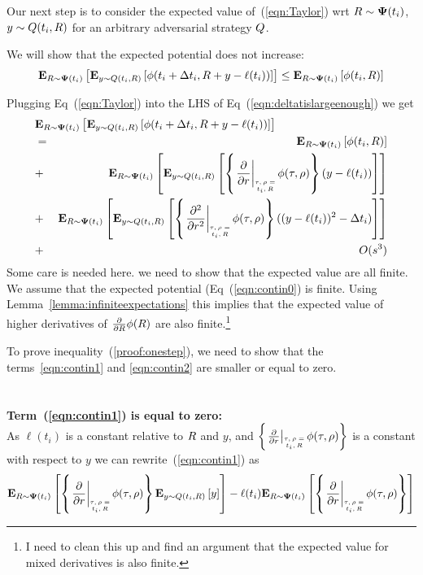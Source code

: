 \documentclass{article}[12pt]
\begin{document}
{Our next step is to consider the expected value of~(\ref{eqn:Taylor}) wrt $R \sim {\bf \Psi}(t_i)$,
$y \sim Q(t_i,R)$ for an arbitrary adversarial strategy
$Q$.

We will show that the expected potential does not increase:
\begin{equation} \label{eqn:deltatislargeenough}
     {\bf E}_{R \sim {\bf \Psi}(t_i)}\left[  {\bf E}_{y \sim Q(t_i,R)}\left[ \phi(t_i+\Delta t_i,R+y-\ell(t_i)) \right] \right] \leq {\bf E}_{R \sim {\bf \Psi}(t_i)}\left[ \phi(t_i,R) \right]
\end{equation}

Plugging Eq~(\ref{eqn:Taylor}) into the LHS of
Eq~(\ref{eqn:deltatislargeenough}) we get
\begin{eqnarray}
  \lefteqn{\E{\R \sim \state(t_i)}{\E{y \sim \adversM(t_i,\R)}{\pot(t_i+\deltat_i,\R+y-\ell(t_i))}}} \\
  &=& \E{\R \sim \state(t_i)}{\pot(t_i,\R)} \label{eqn:contin0}\\
  &+& \E{\R \sim \state(t_i)}{\E{y \sim \adversM(t_i,\R)}{\at{\frac{\partial}{\partial r}} (y-\ell(t_i))}} \label{eqn:contin1}\\
  &+& \E{\R \sim \state(t_i)}{\E{y \sim
      \adversM(t_i,\R)}{\at{\frac{\partial^2}{\partial r^2}}
      ((y-\ell(t_i))^2 - \deltat_i)}}
  \label{eqn:contin2}\\
  &+& O(s^3) \label{eqn:contin3}
\end{eqnarray}
Some care is needed here. we need to show that the expected value
are all finite. We assume that the expected potential
(Eq~(\ref{eqn:contin0}) is finite. Using
Lemma~\ref{lemma:infiniteexpectations} this implies that the expected
value of higher derivatives of $\frac{\partial}{\partial R} \phi(R)$
are also finite.\footnote{I need to clean this up and find an argument
  that the expected value for mixed derivatives is also finite.}


To prove inequality~(\ref{proof:onestep}), we need to show that the
terms~\ref{eqn:contin1} and \ref{eqn:contin2} are smaller or equal to
zero.
~\\~\\~\\
{\bf Term~(\ref{eqn:contin1}) is equal to zero:}\\
As $\ell(t_i)$ is a constant
relative to $R$ and $y$, and $\at{\frac{\partial}{\partial r}}$ is a
constant with respect to $y$ we can rewrite~(\ref{eqn:contin1}) as
\begin{equation} \label{eqnterm1.1}
  \E{\R \sim \state(t_i)}{\at{\frac{\partial}{\partial r}}
    \E{y \sim \adversM(t_i,\R)}{y} }
- \ell(t_i) \E{\R \sim \state(t_i)}{\at{\frac{\partial}{\partial r}}}
\end{equation}

}
\end{document}
